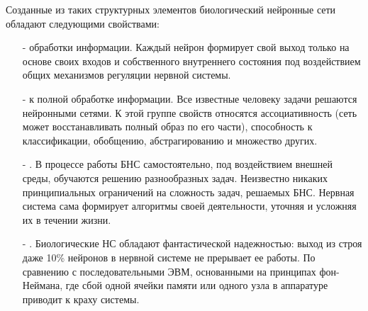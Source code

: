 Созданные из таких структурных элементов биологический нейронные сети обладают следующими свойствами:
\begin{itemize}
\item[-] { обработки информации. }
Каждый нейрон формирует свой выход только на основе своих входов и собственного внутреннего состояния под воздействием общих механизмов регуляции нервной системы.
\item[-] { к полной обработке информации. }
Все известные человеку задачи решаются нейронными сетями.
К этой группе свойств относятся ассоциативность (сеть может восстанавливать полный образ по его части), способность к классификации, обобщению, абстрагированию и множество других.
\item[-] {.}
В процессе работы БНС самостоятельно, под воздействием внешней среды, обучаются решению разнообразных задач.
Неизвестно никаких принципиальных ограничений на сложность задач, решаемых БНС.
Нервная система сама формирует алгоритмы своей деятельности, уточняя и усложняя их в течении жизни.
\item[-] {. }
Биологические НС обладают фантастической надежностью: выход из строя даже 10\% нейронов в нервной системе не прерывает ее работы. 
По сравнению с последовательными ЭВМ, основанными на принципах фон-Неймана, где сбой одной ячейки памяти или одного узла в аппаратуре приводит к краху системы.\cite{COURSE}
\end{itemize}

